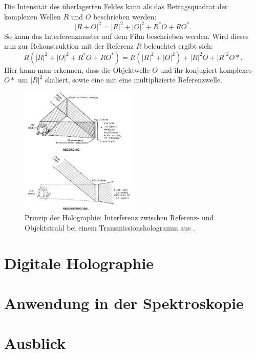 \documentclass[10pt,twocolumn,a4paper]{article}
\begin{document}
Die Intensität des überlagerten Feldes kann als das Betragsquadrat der komplexen Wellen $R$ und $O$ beschrieben werden:
\begin{equation}
    |R + O|^2 = |R|^2 + |O|^2 + R^* O + R O^*.
\end{equation}
So kann das Interferenzmuster auf dem Film beschrieben werden. Wird dieses nun zur Rekonstruktion mit der Referenz $R$ beleuchtet ergibt sich:
\begin{equation}
    R(|R|^2 + |O|^2 + R^* O + R O^*) = R(|R|^2 + |O|^2) + |R|^2O + |R|^2O*.
\end{equation}
Hier kann man erkennen, dass die Objektwelle $O$ und ihr konjugiert komplexes $O*$ um $|R|^2$ skaliert, sowie eine mit eine multiplizierte Referenzwelle.

\begin{figure}
    \centering
    \includegraphics[width=0.5\textwidth]{images/holography.png}
    \caption{Prinzip der Holographie: Interferenz zwischen Referenz- und Objektstrahl bei einem Transmissionshologramm aus \cite{Gabor}.}
    \label{fig:holography}
\end{figure}

\section{Digitale Holographie}

\section{Anwendung in der Spektroskopie}

\section{Ausblick}

\printbibliography
\end{document}

